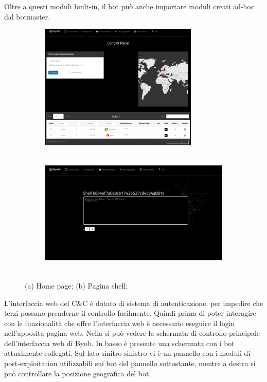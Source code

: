 Oltre a questi moduli built-in, il bot può anche importare moduli creati ad-hoc dal botmaster.




\begin{figure}[hbtp]
    \centering
    \begin{subfigure}[hbtp]{0.45\textwidth}
        \centering
        \includegraphics[width=\textwidth, height=6cm]{res/fig/byob-home.png}
        \caption{}
        \label{fig:byobhome}
    \end{subfigure}
    \hfill
    \begin{subfigure}[hbtp]{0.45\textwidth}
        \centering
        \includegraphics[width=\textwidth , height=6cm]{res/fig/byob-shell.png}
        \caption{}
        \label{fig:byobshell}
    \end{subfigure}
    \caption{(a) Home page; (b) Pagina shell;}
    \label{ciao1}
\end{figure}

L'interfaccia web del C\&C è  dotato di sistema di autenticazione, per impedire che terzi possano prenderne il controllo facilmente. Quindi prima di poter interagire con le funzionalità che offre l'interfaccia web è necessario eseguire il login nell'apposita pagina web.
Nella   si può vedere la schermata di controllo principale dell'interfaccia web di Byob. In basso è presente una schermata con i bot attualmente collegati. Sul lato sinitro sinistro vi è  un pannello con i moduli di post-exploitation utilizzabili sui bot del pannello sottostante, mentre a destra si può controllare la posizione geografica del bot. 

